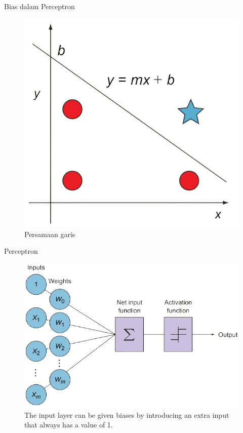 \documentclass{beamer}
\begin{document}
\begin{frame}{Bias dalam Perceptron}
	\begin{figure}[ht]
	\centering
	\includegraphics[scale=0.35]{images/persamaan-garis}
	\caption{Persamaan garis}
\end{figure}		
\end{frame}

\begin{frame}{Perceptron}
	\begin{figure}[ht]
		\centering
		\includegraphics[scale=0.4]{images/perceptron}
		\caption{The input layer can be given biases by introducing an extra input that always has a value of 1.}
	\end{figure}		
\end{frame}
\end{document}
